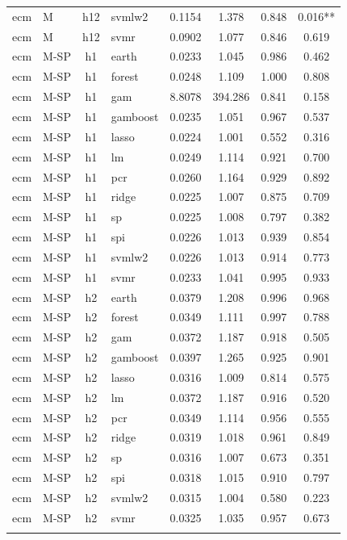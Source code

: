 \begin{ThreePartTable}
\begin{longtable}[t]{llclcccc}
ecm & M & h12 & svmlw2 & 0.1154 & 1.378 & 0.848 & 0.016**\\
ecm & M & h12 & svmr & 0.0902 & 1.077 & 0.846 & 0.619\\
\addlinespace
ecm & M-SP & h1 & earth & 0.0233 & 1.045 & 0.986 & 0.462\\
ecm & M-SP & h1 & forest & 0.0248 & 1.109 & 1.000 & 0.808\\
ecm & M-SP & h1 & gam & 8.8078 & 394.286 & 0.841 & 0.158\\
ecm & M-SP & h1 & gamboost & 0.0235 & 1.051 & 0.967 & 0.537\\
ecm & M-SP & h1 & lasso & 0.0224 & 1.001 & 0.552 & 0.316\\
ecm & M-SP & h1 & lm & 0.0249 & 1.114 & 0.921 & 0.700\\
ecm & M-SP & h1 & pcr & 0.0260 & 1.164 & 0.929 & 0.892\\
ecm & M-SP & h1 & ridge & 0.0225 & 1.007 & 0.875 & 0.709\\
ecm & M-SP & h1 & sp & 0.0225 & 1.008 & 0.797 & 0.382\\
ecm & M-SP & h1 & spi & 0.0226 & 1.013 & 0.939 & 0.854\\
ecm & M-SP & h1 & svmlw2 & 0.0226 & 1.013 & 0.914 & 0.773\\
ecm & M-SP & h1 & svmr & 0.0233 & 1.041 & 0.995 & 0.933\\
\addlinespace
ecm & M-SP & h2 & earth & 0.0379 & 1.208 & 0.996 & 0.968\\
ecm & M-SP & h2 & forest & 0.0349 & 1.111 & 0.997 & 0.788\\
ecm & M-SP & h2 & gam & 0.0372 & 1.187 & 0.918 & 0.505\\
ecm & M-SP & h2 & gamboost & 0.0397 & 1.265 & 0.925 & 0.901\\
ecm & M-SP & h2 & lasso & 0.0316 & 1.009 & 0.814 & 0.575\\
ecm & M-SP & h2 & lm & 0.0372 & 1.187 & 0.916 & 0.520\\
ecm & M-SP & h2 & pcr & 0.0349 & 1.114 & 0.956 & 0.555\\
ecm & M-SP & h2 & ridge & 0.0319 & 1.018 & 0.961 & 0.849\\
ecm & M-SP & h2 & sp & 0.0316 & 1.007 & 0.673 & 0.351\\
ecm & M-SP & h2 & spi & 0.0318 & 1.015 & 0.910 & 0.797\\
ecm & M-SP & h2 & svmlw2 & 0.0315 & 1.004 & 0.580 & 0.223\\
ecm & M-SP & h2 & svmr & 0.0325 & 1.035 & 0.957 & 0.673\\
\addlinespace

\end{longtable}
\end{ThreePartTable}
